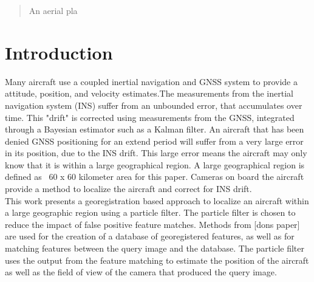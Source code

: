 \documentclass[conference]{IEEEtran}
\begin{document}
\maketitle

\begin{abstract}
An aerial pla
\end{abstract}





%
\IEEEpeerreviewmaketitle



\section{Introduction}
Many aircraft use a coupled inertial navigation and GNSS system to provide a attitude, position, and velocity estimates.The measurements from the inertial navigation system (INS) suffer from an unbounded error, that accumulates over time. This "drift" is corrected using measurements from the GNSS, integrated through a  Bayesian estimator such as a Kalman filter. An aircraft that has been denied GNSS positioning for an extend period will suffer from a very large error in its position, due to the INS drift. This large error means the aircraft may only know that it is within a large geographical region. A large geographical region is defined as ~60 x 60 kilometer area for this paper. Cameras on board the aircraft provide a method to localize the aircraft and correct for INS drift.\\ %
This work presents a georegistration based approach to localize an aircraft within a large geographic region using a particle filter. The particle filter is chosen to reduce the impact of false positive feature matches. Methods from [dons paper] are used for the creation of a database of georegistered features, as well as for matching features between the query image and the database. The particle filter uses the output from the feature matching to estimate the position of the aircraft as well as the field of view of the camera that produced the query image.
\end{document}
